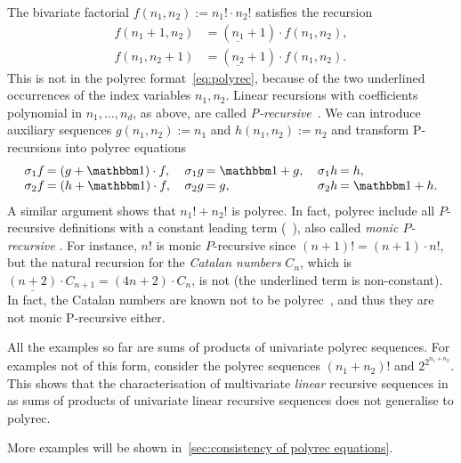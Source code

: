 \begin{example}
    The bivariate factorial $f(n_1, n_2) := n_1! \cdot n_2!$ satisfies the recursion
    \begin{align*}
        f(n_1+1, n_2) &= (\underline {n_1} + 1) \cdot f(n_1, n_2), \\
        f(n_1, n_2+1) &= (\underline {n_2} + 1) \cdot f(n_1, n_2).
    \end{align*}
    This is not in the polyrec format~\cref{eq:polyrec},
    because of the two underlined occurrences of the index variables $n_1, n_2$.
    Linear recursions with coefficients polynomial in $n_1, \dots, n_d$, as above,
    are called \emph{P-recursive}~\cite{Zeilberger:JMAA:1982}.
    We can introduce auxiliary sequences $g(n_1, n_2) := n_1$ and $h(n_1, n_2) := n_2$
    and transform P-recursions into polyrec equations
    \begin{align*}
        \arraycolsep=1pt
        \begin{array}{rl}
            \shift 1 f &= (g+\one) \cdot f, \\
            \shift 2 f &= (h+\one) \cdot f,
        \end{array}
        \quad
        \begin{array}{rl}
            \shift 1 g &= \one + g, \\
            \shift 2 g &= g,
        \end{array}
        \quad
        \begin{array}{rl}
            \shift 1 h &= h, \\
            \shift 2 h &= \one + h.
        \end{array}
    \end{align*}
    A similar argument shows that $n_1! + n_2!$ is polyrec.
    In fact, polyrec include all $P$-recursive definitions with a constant leading term
    (\cf~\cite[Proposition 3.6]{Lipshitz:D-finite:JA:1989}),
    also called \emph{monic $P$-recursive}\-
    \cite[page 5]{Buna-MargineanChevalShirmohammadiWorrell:POPL:2024}.
    For instance, $n!$ is monic $P$-recursive since $(n+1)! = (n+1) \cdot n!$,
    but the natural recursion for the \emph{Catalan numbers} $C_n$, which is $\underline {(n+2)} \cdot C_{n+1} = (4n+2) \cdot C_n$, is not
    (the underlined term is non-constant).
    In fact, the Catalan numbers are known not to be polyrec~\cite[Corollary 4.1]{Cadilhac:Mazowiecki:Paperman:Pilipczuk:Senizergues:ToCS:2021},
    and thus they are not monic P-recursive either.
\end{example}
%
\begin{remark}
    All the examples so far are sums of products of univariate polyrec sequences.
    For examples not of this form,
    consider the polyrec sequences $(n_1 + n_2)!$ and $2^{2^{n_1 + n_2}}$.
    This shows that the characterisation of multivariate \emph{linear} recursive sequences
    in~\cite[Proposition 2.1]{Karhumaki:TCS:1977} as sums of products of univariate linear recursive sequences
    does not generalise to polyrec.
\end{remark}
%
\noindent
More examples will be shown in~\cref{sec:consistency of polyrec equations}.

